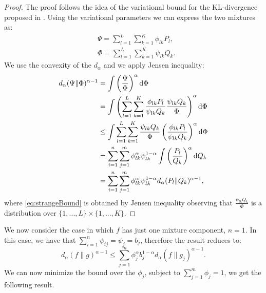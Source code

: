 \begin{proof}
The proof follows the idea of the variational bound for the KL-divergence proposed in \cite{hershey2007approximating}. Using the variational parameters we can express the two mixtures as:
\begin{align*}
    & \Psi = \sum_{l=1}^L \sum_{k=1}^K \phi_{lk} P_l,\\
    & \Phi = \sum_{l=1}^L \sum_{k=1}^K \psi_{lk} Q_k.
\end{align*}
    We use the convexity of the $d_{\alpha}$ and we apply Jensen inequality:
    \begin{align}
        d_{\alpha}(\Psi \| \Phi)^{\alpha-1} & = \int \left( \frac{\Psi}{\Phi} \right)^{\alpha} \mathrm{d}\Phi \notag\\
        & = \int \left( \sum_{l=1}^L \sum_{k=1}^K \frac{\phi_{lk} P_l}{\psi_{lk} Q_k} \frac{\psi_{lk} Q_k}{\Phi} \right)^{\alpha} \mathrm{d}\Phi \notag \\
        & \le \int \sum_{l=1}^L \sum_{k=1}^K \frac{\psi_{lk} Q_k}{\Phi} \left(  \frac{\phi_{lk} P_l}{\psi_{lk} Q_k}  \right)^{\alpha} \mathrm{d}\Phi \label{eq:strangeBound}\\
        & = \sum_{i=1}^n \sum_{j=1}^m \phi_{lk}^{\alpha} \psi_{lk}^{1-\alpha}  \int \left( \frac{P_l}{Q_k}  \right)^{\alpha} \mathrm{d}Q_k \notag \\
        & = \sum_{i=1}^n \sum_{j=1}^m \phi_{lk}^{\alpha} \psi_{lk}^{1-\alpha}  d_{\alpha}(P_l \| Q_k)^{\alpha-1}, \notag
    \end{align}
    where \eqref{eq:strangeBound} is obtained by Jensen inequality observing that $\frac{\psi_{lk} Q_k}{\Phi}$ is a distribution over $\{1,...,L\} \times \{1,...,K\}$.
\end{proof}

We now consider the case in which $f$ has just one mixture component, \ie $n = 1$. In this case, we have that $\sum_{i=1}^n \psi_{ij}= \psi_j = b_j$, therefore the result reduces to:
\begin{equation}
     d_{\alpha} (f \| g)^{\alpha-1} \le  \sum_{j=1}^m \phi_{j}^\alpha b_{j}^{1-\alpha} d_{\alpha} (f \| g_j)^{\alpha-1}.
\end{equation}
We can now minimize the bound over the $\phi_j$, subject to $\sum_{j=1}^m \phi_j = 1$, we get the following result.

